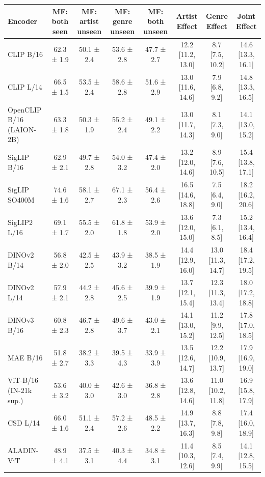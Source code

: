 \begin{tabular}{lccccccc}
\toprule
Encoder & MF: both seen & MF: artist unseen & MF: genre unseen & MF: both unseen & Artist Effect & Genre Effect & Joint Effect \\
\midrule
CLIP B/16 & 62.3 ± 1.9 & 50.1 ± 2.4 & 53.6 ± 2.8 & 47.7 ± 2.7 & 12.2 [11.2, 13.0] & 8.7 [7.5, 10.2] & 14.6 [13.3, 16.1] \\
CLIP L/14 & 66.5 ± 1.5 & 53.5 ± 2.4 & 58.6 ± 2.8 & 51.6 ± 2.9 & 13.0 [11.6, 14.6] & 7.9 [6.8, 9.2] & 14.8 [13.3, 16.5] \\
OpenCLIP B/16 (LAION-2B) & 63.3 ± 1.8 & 50.3 ± 1.9 & 55.2 ± 2.4 & 49.1 ± 2.2 & 13.0 [11.7, 14.3] & 8.1 [7.3, 9.0] & 14.1 [13.0, 15.2] \\
SigLIP B/16 & 62.9 ± 2.1 & 49.7 ± 2.8 & 54.0 ± 3.2 & 47.4 ± 2.0 & 13.2 [12.0, 14.6] & 8.9 [7.6, 10.5] & 15.4 [13.8, 17.1] \\
SigLIP SO400M & 74.6 ± 1.6 & 58.1 ± 2.7 & 67.1 ± 2.3 & 56.4 ± 2.6 & 16.5 [14.6, 18.8] & 7.5 [6.4, 9.0] & 18.2 [16.2, 20.6] \\
SigLIP2 L/16 & 69.1 ± 1.7 & 55.5 ± 2.0 & 61.8 ± 1.8 & 53.9 ± 2.0 & 13.6 [12.0, 15.0] & 7.3 [6.1, 8.5] & 15.2 [13.4, 16.4] \\
DINOv2 B/14 & 56.8 ± 2.0 & 42.5 ± 2.5 & 43.9 ± 3.2 & 38.5 ± 1.9 & 14.4 [12.9, 16.0] & 13.0 [11.3, 14.7] & 18.4 [17.2, 19.5] \\
DINOv2 L/14 & 57.9 ± 2.1 & 44.2 ± 2.8 & 45.6 ± 2.5 & 39.9 ± 1.9 & 13.7 [12.1, 15.4] & 12.3 [11.3, 13.4] & 18.0 [17.2, 18.8] \\
DINOv3 B/16 & 60.8 ± 2.3 & 46.7 ± 2.8 & 49.6 ± 3.7 & 43.0 ± 2.1 & 14.1 [13.0, 15.2] & 11.2 [9.9, 12.5] & 17.8 [17.0, 18.5] \\
MAE B/16 & 51.8 ± 2.7 & 38.2 ± 3.3 & 39.5 ± 4.3 & 33.9 ± 3.9 & 13.5 [12.6, 14.7] & 12.2 [10.9, 13.7] & 17.9 [16.9, 19.0] \\
ViT-B/16 (IN-21k sup.) & 53.6 ± 3.2 & 40.0 ± 3.0 & 42.6 ± 3.0 & 36.8 ± 2.8 & 13.6 [12.8, 14.6] & 11.0 [10.2, 11.8] & 16.9 [15.8, 17.9] \\
CSD L/14 & 66.0 ± 1.6 & 51.1 ± 2.4 & 57.2 ± 2.6 & 48.5 ± 2.2 & 14.9 [13.7, 16.3] & 8.8 [7.8, 9.8] & 17.4 [16.0, 18.9] \\
ALADIN-ViT & 48.9 ± 4.1 & 37.5 ± 3.1 & 40.3 ± 4.4 & 34.8 ± 3.1 & 11.4 [10.3, 12.6] & 8.5 [7.4, 9.9] & 14.1 [12.8, 15.5] \\
\bottomrule
\end{tabular}
